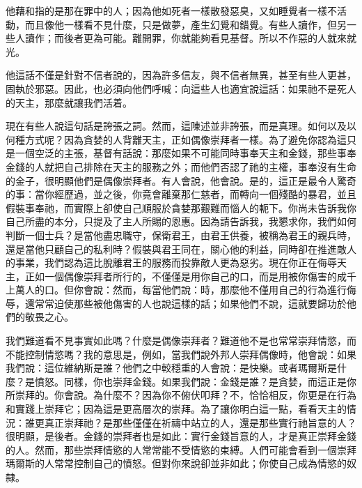 他藉和指的是那在罪中的人；因為他如死者一樣散發惡臭，又如睡覺者一樣不活動，而且像他一樣看不見什麼，只是做夢，產生幻覺和錯覺。有些人讀作，但另一些人讀作；而後者更為可能。離開罪，你就能夠看見基督。所以不作惡的人就來就光。\par

他這話不僅是針對不信者說的，因為許多信友，與不信者無異，甚至有些人更甚，固執於邪惡。因此，也必須向他們呼喊：向這些人也適宜說這話：如果祂不是死人的天主，那麼就讓我們活着。\par

現在有些人說這句話是誇張之詞。然而，這陳述並非誇張，而是真理。如何以及以何種方式呢？因為貪婪的人背離天主，正如偶像崇拜者一樣。為了避免你認為這只是一個空泛的主張，基督有話說：那麼如果不可能同時事奉天主和金錢，那些事奉金錢的人就把自己排除在天主的服務之外；而他們否認了祂的主權，事奉沒有生命的金子，很明顯他們是偶像崇拜者。有人會說，他會說。是的，這正是最令人驚奇的事：當你經歷過，並之後，你竟會離棄那仁慈者，而轉向一個殘酷的暴君，並且假裝事奉祂，而實際上卻使自己順服於貪婪那艱難而惱人的軛下。你尚未告訴我你自己所盡的本分，只提及了主人所賜的恩惠。因為請告訴我，我懇求你，我們如何判斷一個士兵？是當他盡忠職守，保衛君王，由君王供養，被稱為君王的親兵時，還是當他只顧自己的私利時？假裝與君王同在，關心他的利益，同時卻在推進敵人的事業，我們認為這比脫離君王的服務而投靠敵人更為惡劣。現在你正在侮辱天主，正如一個偶像崇拜者所行的，不僅僅是用你自己的口，而是用被你傷害的成千上萬人的口。但你會說：然而，每當他們說：時，那麼他不僅用自己的行為進行侮辱，還常常迫使那些被他傷害的人也說這樣的話；如果他們不說，這就要歸功於他們的敬畏之心。\par

我們難道看不見事實如此嗎？什麼是偶像崇拜者？難道他不是也常常崇拜情慾，而不能控制情慾嗎？我的意思是，例如，當我們說外邦人崇拜偶像時，他會說：如果我們說：這位維納斯是誰？他們之中較穩重的人會說：是快樂。或者瑪爾斯是什麼？是憤怒。同樣，你也崇拜金錢。如果我們說：金錢是誰？是貪婪，而這正是你所崇拜的。你會說。為什麼不？因為你不俯伏叩拜？不，恰恰相反，你更是在行為和實踐上崇拜它；因為這是更高層次的崇拜。為了讓你明白這一點，看看天主的情況：誰更真正崇拜祂？是那些僅僅在祈禱中站立的人，還是那些實行祂旨意的人？很明顯，是後者。金錢的崇拜者也是如此：實行金錢旨意的人，才是真正崇拜金錢的人。然而，那些崇拜情慾的人常常能不受情慾的束縛。人們可能會看到一個崇拜瑪爾斯的人常常控制自己的憤怒。但對你來說卻並非如此；你使自己成為情慾的奴隸。\par

